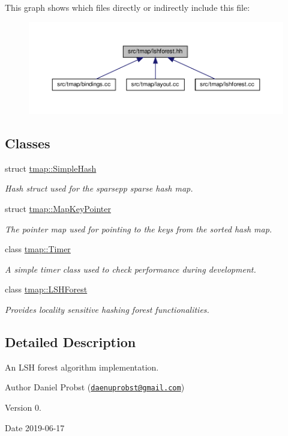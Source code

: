 This graph shows which files directly or indirectly include this file\+:\nopagebreak
\begin{figure}[H]
\begin{center}
\leavevmode
\includegraphics[width=350pt]{lshforest_8hh__dep__incl}
\end{center}
\end{figure}
\subsection*{Classes}
\begin{DoxyCompactItemize}
\item 
struct \hyperlink{structtmap_1_1SimpleHash}{tmap\+::\+Simple\+Hash}
\begin{DoxyCompactList}\small\item\em Hash struct used for the sparsepp sparse hash map. \end{DoxyCompactList}\item 
struct \hyperlink{structtmap_1_1MapKeyPointer}{tmap\+::\+Map\+Key\+Pointer}
\begin{DoxyCompactList}\small\item\em The pointer map used for pointing to the keys from the sorted hash map. \end{DoxyCompactList}\item 
class \hyperlink{classtmap_1_1Timer}{tmap\+::\+Timer}
\begin{DoxyCompactList}\small\item\em A simple timer class used to check performance during development. \end{DoxyCompactList}\item 
class \hyperlink{classtmap_1_1LSHForest}{tmap\+::\+L\+S\+H\+Forest}
\begin{DoxyCompactList}\small\item\em Provides locality sensitive hashing forest functionalities. \end{DoxyCompactList}\end{DoxyCompactItemize}


\subsection{Detailed Description}
An L\+SH forest algorithm implementation. 

\begin{DoxyAuthor}{Author}
Daniel Probst (\href{mailto:daenuprobst@gmail.com}{\tt daenuprobst@gmail.\+com}) 
\end{DoxyAuthor}
\begin{DoxyVersion}{Version}
0. 
\end{DoxyVersion}
\begin{DoxyDate}{Date}
2019-\/06-\/17 
\end{DoxyDate}
